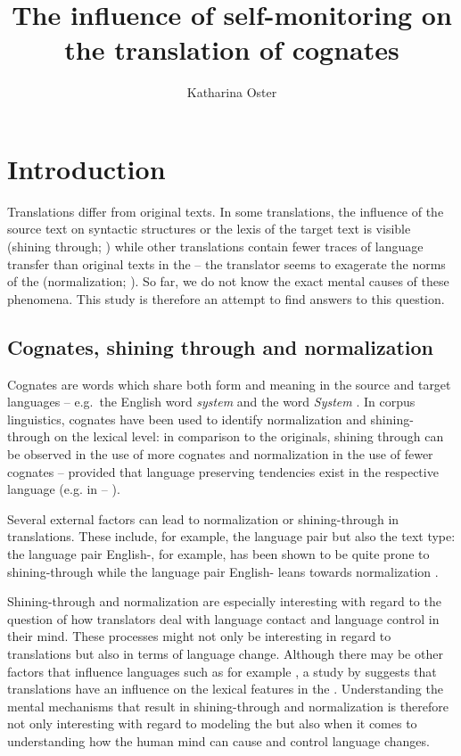 \documentclass[output=paper]{LSP/langsci}
\title{The influence of self-monitoring on the translation of cognates}
\author{Katharina Oster}
\affiliation{Johannes-Gutenberg-Universität Mainz}
\begin{document}
\section{Introduction}\label{oster:sec:1}
Translations differ from original texts. In some translations, the influence of the source text on syntactic structures or the lexis of the target text is visible (shining through; \citealt{Teich2003}) while other translations contain fewer traces of language transfer than original texts in the  -- the translator seems to exagerate the norms of the  (normalization; \citealt{Baker1996}). So far, we do not know the exact mental causes of these phenomena. This study is therefore an attempt to find answers to this question. 

\subsection{Cognates, shining through and normalization}\label{oster:sec:1.1}
Cognates are words which share both form and meaning in the source and target languages -- e.g.\ the English word \textit{system} and the  word \textit{System} \citep{Stamenov2010}. In corpus linguistics, cognates have been used to identify normalization and shining-through on the lexical level: in comparison to the originals, shining through can be observed in the use of more cognates and normalization in the use of fewer cognates --  provided that language preserving tendencies exist in the respective language (e.g. in  -- \citealt{Vintar2005}). 

Several external factors can lead to normalization or shining-through in translations. These include, for example, the language pair but also the text type: the language pair English-, for example, has been shown to be quite prone to shining-through while the language pair English- leans towards normalization \citep{Vintar2005}.

Shining-through and normalization are especially interesting with regard to the question of how translators deal with language contact and language control in their mind. These processes might not only be interesting in regard to translations but also in terms of language change. Although there may be other factors that influence languages such as  for example \citet{HansenSchirra2012What}, a study by \citet{Becher2009Convergence} suggests that translations have an influence on the lexical features in the . Understanding the mental mechanisms that result in shining-through and normalization is therefore not only interesting with regard to modeling the  but also when it comes to understanding how the human mind can cause and control language changes.
\end{document}
